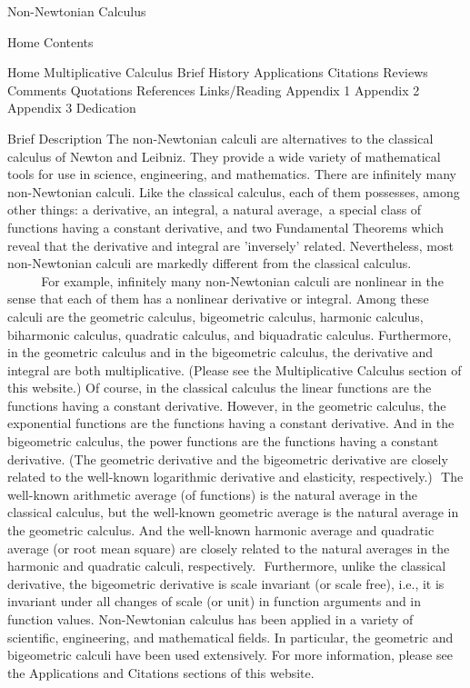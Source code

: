 \documentclass[12pt]{article}
\begin{document}
Non-Newtonian Calculus







Home
Contents

Home
Multiplicative Calculus
Brief History
Applications
Citations
Reviews
Comments
Quotations
References
Links/Reading
Appendix 1
Appendix 2
Appendix 3
Dedication




Brief Description
The non-Newtonian calculi are alternatives to the classical calculus of Newton and Leibniz. They provide a wide variety of mathematical tools for use in science, engineering, and mathematics.
There are infinitely many non-Newtonian calculi. Like the classical calculus, each of them possesses, among other things: a derivative, an integral, a natural average, a special class of functions having a constant derivative, and two Fundamental Theorems which reveal that the derivative and integral are 'inversely' related. Nevertheless, most non-Newtonian calculi are markedly different from the classical calculus.            For example, infinitely many non-Newtonian calculi are nonlinear in the sense that each of them has a nonlinear derivative or integral. Among these calculi are the geometric calculus, bigeometric calculus, harmonic calculus, biharmonic calculus, quadratic calculus, and biquadratic calculus. Furthermore, in the geometric calculus and in the bigeometric calculus, the derivative and integral are both multiplicative. (Please see the Multiplicative Calculus section of this website.)
Of course, in the classical calculus the linear functions are the functions having a constant derivative. However, in the geometric calculus, the exponential functions are the functions having a constant derivative. And in the bigeometric calculus, the power functions are the functions having a constant derivative. (The geometric derivative and the bigeometric derivative are closely related to the well-known logarithmic derivative and elasticity, respectively.)  The well-known arithmetic average (of functions) is the natural average in the classical calculus, but the well-known geometric average is the natural average in the geometric calculus. And the well-known harmonic average and quadratic average (or root mean square) are closely related to the natural averages in the harmonic and quadratic calculi, respectively.  Furthermore, unlike the classical derivative, the bigeometric derivative is scale invariant (or scale free), i.e., it is invariant under all changes of scale (or unit) in function arguments and in function values.
Non-Newtonian calculus has been applied in a variety of scientific, engineering, and mathematical fields. In particular, the geometric and bigeometric calculi have been used extensively. For more information, please see the Applications and Citations sections of this website.
\end{document}
